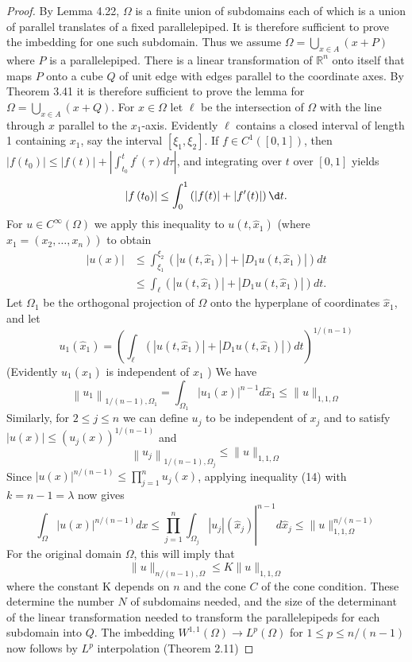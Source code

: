 \begin{proof}
  By Lemma 4.22, $\Omega$ is a finite union of subdomains each of which is a union of parallel 
  translates of a fixed parallelepiped. It is therefore sufficient to prove the imbedding for one 
  such subdomain. Thus we assume $\Omega=\bigcup_{x \in A}(x+P)$ where $P$ is a parallelepiped. 
  There is a linear transformation of $\mathbb{R}^n$ onto itself that
  maps $P$ onto a cube $Q$ of unit edge with edges parallel to the coordinate axes.
  By Theorem 3.41 it is therefore sufficient to prove the lemma
  for $\Omega=\bigcup_{x \in A}(x+Q)$. For $x \in \Omega$ let $\ell$ be the intersection of 
  $\Omega$ with the line through $x$ parallel to the $x_1$-axis. Evidently $\ell$ contains a 
  closed interval of length 1 containing $x_1$, say the interval $\left[\xi_1, \xi_2\right]$.
  If $f \in C^1([0,1])$, then $\left|f\left(t_0\right)\right| \leq|f(t)|+\left|\int_{t_0}^t f^{\prime}(\tau) d \tau\right|$, and integrating over $t$ over $[0,1]$ yields
  \[
  \left|f\left(t_0\right)\right|
    \leq \int_0^1\left(|f(t)|+\left|f^{\prime}(t)\right|\right) \d t.
  \]
  For $u \in C^{\infty}(\Omega)$ we apply this inequality to $u\left(t, \hat{x}_1\right)$ (where $\left.\hat{x}_1=\left(x_2, \ldots, x_n\right)\right)$ to obtain
  \[
  \begin{aligned}
  |u(x)| & \leq \int_{\xi_1}^{\xi_2}\left(\left|u\left(t, \hat{x}_1\right)\right|+\left|D_1 u\left(t, \hat{x}_1\right)\right|\right) d t \\
  & \leq \int_{\ell}\left(\left|u\left(t, \hat{x}_1\right)\right|+\left|D_1 u\left(t, \hat{x}_1\right)\right|\right) d t .
  \end{aligned}
  \]
  Let $\Omega_1$ be the orthogonal projection of $\Omega$ onto the hyperplane of coordinates $\hat{x}_1$, and let
  \[
  u_1\left(\hat{x}_1\right)=\left(\int_{\ell}\left(\left|u\left(t, \hat{x}_1\right)\right|+\left|D_1 u\left(t, \hat{x}_1\right)\right|\right) d t\right)^{1 /(n-1)}
  \]
  (Evidently $u_1\left(\hat{x}_1\right)$ is independent of $x_1$ ) We have
  \[
  \left\|u_1\right\|_{1 /(n-1), \Omega_1}=\int_{\Omega_1}\left|u_1(x)\right|^{n-1} d \hat{x}_1 \leq\|u\|_{1,1, \Omega}
  \]
  Similarly, for $2 \leq j \leq n$ we can define $u_j$ to be independent of $x_j$ and to satisfy $|u(x)| \leq\left(u_j(x)\right)^{1 /(n-1)}$ and
  \[
  \left\|u_j\right\|_{1 /(n-1), \Omega_j} \leq\|u\|_{1,1, \Omega}
  \]
  Since $|u(x)|^{n /(n-1)} \leq \prod_{j=1}^n u_j(x)$, applying inequality (14) with $k=n-1=\lambda$ now gives
  \[
  \int_{\Omega}|u(x)|^{n /(n-1)} d x \leq\left.\prod_{j=1}^n \int_{\Omega_j}\left|u_j\right|\left(\hat{x}_j\right)\right|^{n-1} d \hat{x}_j \leq\|u\|_{1,1, \Omega}^{n /(n-1)}
  \]
  For the original domain $\Omega$, this will imply that
  \[
  \|u\|_{n /(n-1), \Omega} \leq K\|u\|_{1,1, \Omega}
  \]
  where the constant $\mathrm{K}$ depends on $n$ and the cone $C$ of the cone condition. These determine the number $N$ of subdomains needed, and the size of the determinant of the linear transformation needed to transform the parallelepipeds for each subdomain into $Q$. The imbedding $W^{1,1}(\Omega) \rightarrow L^p(\Omega)$ for $1 \leq p \leq n /(n-1)$ now follows by $L^p$ interpolation (Theorem 2.11)
\end{proof}


